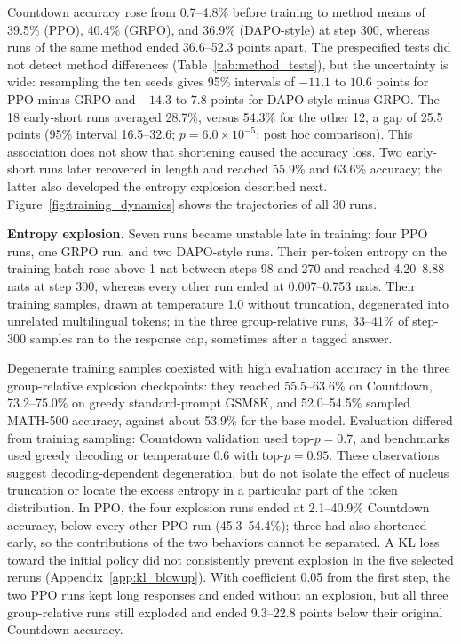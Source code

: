 \documentclass[ai,article,submit,oneauthor]{Definitions/mdpi}
\begin{document}
Countdown accuracy rose from 0.7--4.8\% before training to method means of 39.5\% (PPO), 40.4\% (GRPO), and 36.9\% (DAPO-style) at step 300, whereas runs of the same method ended 36.6--52.3 points apart. The prespecified tests did not detect method differences (Table~\ref{tab:method_tests}), but the uncertainty is wide: resampling the ten seeds gives 95\% intervals of $-11.1$ to $10.6$ points for PPO minus GRPO and $-14.3$ to $7.8$ points for DAPO-style minus GRPO. The 18 early-short runs averaged 28.7\%, versus 54.3\% for the other 12, a gap of 25.5 points (95\% interval 16.5--32.6; $p=6.0\times10^{-5}$; post hoc comparison). This association does not show that shortening caused the accuracy loss. Two early-short runs later recovered in length and reached 55.9\% and 63.6\% accuracy; the latter also developed the entropy explosion described next. Figure~\ref{fig:training_dynamics} shows the trajectories of all 30 runs.

\noindent\textbf{Entropy explosion.}
Seven runs became unstable late in training: four PPO runs, one GRPO run, and two DAPO-style runs. Their per-token entropy on the training batch rose above 1 nat between steps 98 and 270 and reached 4.20--8.88 nats at step 300, whereas every other run ended at 0.007--0.753 nats. Their training samples, drawn at temperature 1.0 without truncation, degenerated into unrelated multilingual tokens; in the three group-relative runs, 33--41\% of step-300 samples ran to the response cap, sometimes after a tagged answer.

Degenerate training samples coexisted with high evaluation accuracy in the three group-relative explosion checkpoints: they reached 55.5--63.6\% on Countdown, 73.2--75.0\% on greedy standard-prompt GSM8K, and 52.0--54.5\% sampled MATH-500 accuracy, against about 53.9\% for the base model. Evaluation differed from training sampling: Countdown validation used top-$p=0.7$, and benchmarks used greedy decoding or temperature 0.6 with top-$p=0.95$. These observations suggest decoding-dependent degeneration, but do not isolate the effect of nucleus truncation or locate the excess entropy in a particular part of the token distribution. In PPO, the four explosion runs ended at 2.1--40.9\% Countdown accuracy, below every other PPO run (45.3--54.4\%); three had also shortened early, so the contributions of the two behaviors cannot be separated. A KL loss toward the initial policy did not consistently prevent explosion in the five selected reruns (Appendix~\ref{app:kl_blowup}). With coefficient 0.05 from the first step, the two PPO runs kept long responses and ended without an explosion, but all three group-relative runs still exploded and ended 9.3--22.8 points below their original Countdown accuracy.
\end{document}
